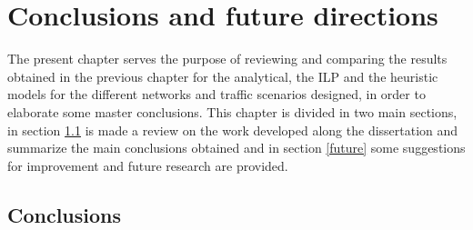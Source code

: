 \chapter{Conclusions and future directions}
\label{chapter7}

The present chapter serves the purpose of reviewing and comparing the results obtained in the previous chapter for the analytical, the ILP and the heuristic models for the different networks and traffic scenarios designed, in order to elaborate some master conclusions. This chapter is divided in two main sections, in section \ref{conclusions} is made a review on the work developed along the dissertation and summarize the main conclusions obtained and in section \ref{future} some suggestions for improvement and future research are provided.


\section{Conclusions}
\label{conclusions}

